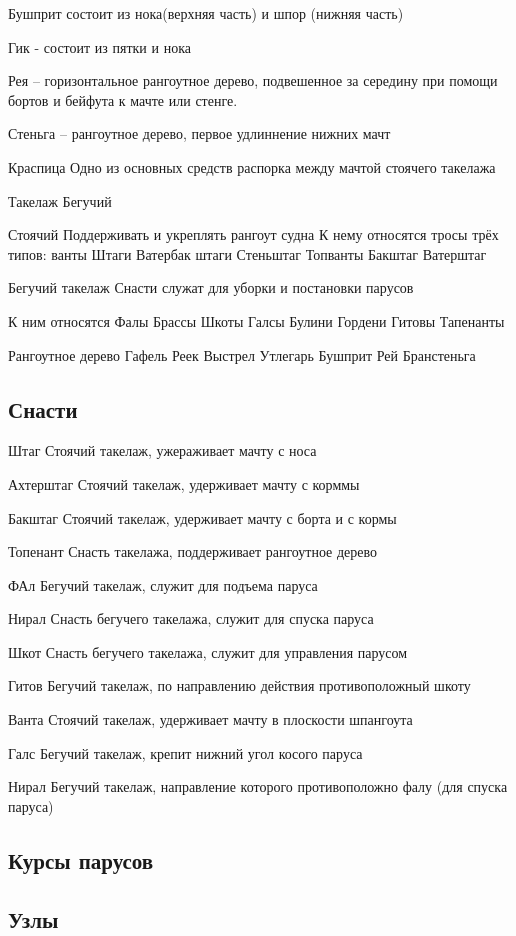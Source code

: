 \documentclass{article}        %
\begin{document}
Бушприт состоит из нока(верхняя часть) и шпор (нижняя часть)

Гик - состоит из пятки и нока


Рея -- горизонтальное рангоутное дерево, подвешенное за середину при помощи бортов и бейфута к мачте или стенге.

Стеньга -- рангоутное дерево, первое удлиннение нижних мачт

Краспица
Одно из основных средств распорка между мачтой стоячего такелажа



Такелаж
Бегучий

Стоячий
Поддерживать и укреплять рангоут судна
К нему относятся тросы трёх типов:
ванты
Штаги
Ватербак штаги
Стеньштаг
Топванты
Бакштаг
Ватерштаг

Бегучий такелаж
Снасти служат для уборки и постановки парусов

К ним относятся
Фалы
Брассы
Шкоты
Галсы
Булини
Гордени
Гитовы
Тапенанты


Рангоутное дерево
Гафель
Реек
Выстрел
Утлегарь
Бушприт
Рей
Бранстеньга


\subsection{Снасти}
Штаг
Стоячий такелаж, ужераживает мачту с носа

Ахтерштаг
Стоячий такелаж, удерживает мачту с корммы

Бакштаг
Стоячий такелаж, удерживает мачту с борта и с кормы

Топенант
Снасть такелажа, поддерживает рангоутное дерево

ФАл
Бегучий такелаж, служит для подъема паруса

Нирал
Снасть бегучего такелажа, служит для спуска паруса

Шкот
Снасть бегучего такелажа, служит для управления парусом

Гитов
Бегучий такелаж, по направлению действия противоположный шкоту

Ванта
Стоячий такелаж, удерживает мачту в плоскости шпангоута

Галс
Бегучий такелаж, крепит нижний угол косого паруса

Нирал
Бегучий такелаж, направление которого противоположно фалу (для спуска паруса)


\subsection{Курсы парусов}

\subsection{Узлы}
\end{document}
